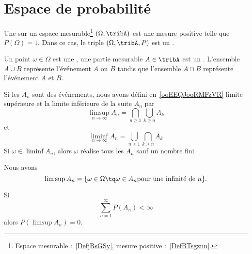 
\section{Espace de probabilité}

\begin{definition}
    Une  sur un espace mesurable\footnote{Espace mesurable :~\ref{DefjRsGSy}, mesure positive :~\ref{DefBTsgznn}.} \( (\Omega,\tribA)\) est une mesure positive telle que \( P(\Omega)=1\). Dans ce cas, le triple \( (\Omega,\tribA,P)\) est un .
\end{definition}

Un point \( \omega\in\Omega\) est une , une partie mesurable \( A\in\tribA\) est un . L'ensemble \( A\cup B\) représente l'événement \( A\) ou \( B\) tandis que l'ensemble \( A\cap B\) représente l'événement \( A\) et \( B\).

Si les \( A_n\) sont des événements, nous avons défini en~\ref{ooEEQJooRMFzVR} limite supérieure et la limite inférieure de la suite \( A_n\) par
\begin{equation}
    \limsup_{n\to\infty}A_n=\bigcap_{n\geq 1}\bigcup_{k\geq n}A_k
\end{equation}
et
\begin{equation}
    \liminf_{n\to\infty}A_n=\bigcup_{n\geq 1}\bigcap_{k\geq n}A_k
\end{equation}
Si \( \omega\in\liminf A_n\), alors \( \omega\) réalise tous les \( A_n\) sauf un nombre fini.

Nous avons
\begin{equation}
    \limsup A_n=\{ \omega\in\Omega\tq \omega\in A_n\text{pour une infinité de } n \}.
\end{equation}

\begin{theorem}
    Si
    \begin{equation}
        \sum_{n=1}^{\infty}P(A_n)<\infty
    \end{equation}
    alors \( P(\limsup A_n)=0\).
\end{theorem}


